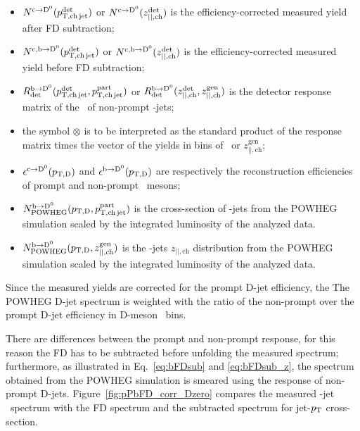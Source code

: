 \begin{itemize}
\item $N^{\rm c\rightarrow\mathrm{D^{0}}}(p_{\mathrm{T,ch\,jet}}^{\mathrm{det}})$ or $N^{\rm c\rightarrow\mathrm{D^{0}}}(z_{||,\text{ch}}^{\text{det}})$ is the efficiency-corrected measured yield after FD subtraction; 
\item $N^{\rm c,b\rightarrow\mathrm{D^{0}}}(p_{\mathrm{T,ch\,jet}}^{\mathrm{det}})$ or $N^{\rm c,b\rightarrow\mathrm{D^{0}}}(z_{||,\text{ch}}^{\text{det}})$ is the efficiency-corrected measured yield before FD subtraction;
\item $R_{\rm det}^{\rm b\rightarrow\mathrm{D^{0}}}(p_{\mathrm{T,ch\,jet}}^{\mathrm{det}},p_{\mathrm{T,ch\,jet}}^{\mathrm{part}})$ or $R_{\rm det}^{\rm b\rightarrow\mathrm{D^{0}}}(z_{||,\text{ch}}^{\text{det}},z_{||,\text{ch}}^{\text{gen}})$ is the detector response matrix of the \pt\ of non-prompt \Dzero-jets;
\item the symbol $\otimes$ is to be interpreted as the standard product of the response matrix times the vector of the yields in bins of \ptchjetgen\ or $z_{||,\text{ch}}^{\text{gen}}$;
\item $\epsilon^{\rm c\rightarrow\mathrm{D^{0}}}(p_{\mathrm{T,D}})$ and $\epsilon^{\rm b\rightarrow\mathrm{D^{0}}}(p_{\mathrm{T,D}})$ are respectively the reconstruction efficiencies of prompt and non-prompt \Dzero\ mesons;
\item $N^{\rm b\rightarrow\mathrm{D^{0}}}_{\rm POWHEG}(p_{\mathrm{T,D}},p_{\mathrm{T,ch\,jet}}^{\mathrm{part}})$ is the cross-section of \Dzero-jets from the POWHEG simulation scaled by the integrated luminosity of the analyzed data.
\item $N^{\rm b\rightarrow\mathrm{D^{0}}}_{\rm POWHEG}(p_{\mathrm{T,D}},z_{||,\text{ch}}^{\text{gen}})$ is the \Dzero-jets $z_{||,\text{ch}}$ distribution from the POWHEG simulation scaled by the integrated luminosity of the analyzed data.
\end{itemize}
Since the measured yields are corrected for the prompt D-jet efficiency, the The POWHEG D-jet spectrum is weighted with the ratio of the non-prompt over the prompt D-jet efficiency in D-meson \pt\ bins.

There are differences between the prompt and non-prompt response, for this reason the FD has to be subtracted before unfolding the measured spectrum; furthermore, as illustrated in Eq.~\ref{eq:bFDsub} and \ref{eq:bFDsub_z}, the spectrum obtained from the POWHEG simulation is smeared using the response of non-prompt D-jets. 
Figure~\ref{fig:pPbFD_corr_Dzero} compares the measured \Dzero-jet \pt\ spectrum with the FD spectrum and the subtracted spectrum for jet-$p_{\text T}$ cross-section.

